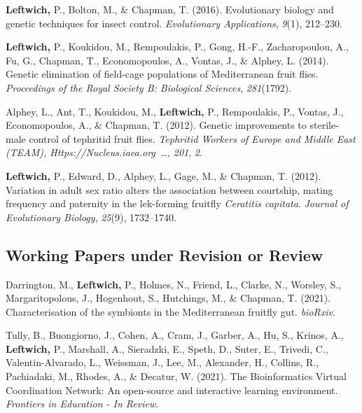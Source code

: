 \documentclass[11pt, a4paper]{awesome-cv}
\begin{document}
\leavevmode\hypertarget{ref-1}{}%
\textbf{Leftwich,} P., Bolton, M., \& Chapman, T. (2016). Evolutionary
biology and genetic techniques for insect control. \emph{Evolutionary
Applications}, \emph{9}(1), 212--230.

\leavevmode\hypertarget{ref-2}{}%
\textbf{Leftwich,} P., Koukidou, M., Rempoulakis, P., Gong, H.-F.,
Zacharopoulou, A., Fu, G., Chapman, T., Economopoulos, A., Vontas, J.,
\& Alphey, L. (2014). Genetic elimination of field-cage populations of
{Mediterranean} fruit flies. \emph{Proceedings of the Royal Society B:
Biological Sciences}, \emph{281}(1792).

\leavevmode\hypertarget{ref-18}{}%
Alphey, L., Ant, T., Koukidou, M., \textbf{Leftwich,} P., Rempoulakis,
P., Vontas, J., Economopoulos, A., \& Chapman, T. (2012). Genetic
improvements to sterile-male control of tephritid fruit flies.
\emph{Tephritid Workers of Europe and Middle East (TEAM),
Https://Nucleus.iaea.org~\ldots, 201}, \emph{2}.

\leavevmode\hypertarget{ref-4}{}%
\textbf{Leftwich,} P., Edward, D., Alphey, L., Gage, M., \& Chapman, T.
(2012). Variation in adult sex ratio alters the association between
courtship, mating frequency and paternity in the lek-forming fruitfly
\emph{{Ceratitis} capitata}. \emph{Journal of Evolutionary Biology},
\emph{25}(9), 1732--1740.

\hypertarget{working-papers-under-revision-or-review}{%
\subsection{Working Papers under Revision or
Review}\label{working-papers-under-revision-or-review}}

\hypertarget{refs_working_paper}{}
\leavevmode\hypertarget{ref-3}{}%
Darrington, M., \textbf{Leftwich,} P., Holmes, N., Friend, L., Clarke,
N., Worsley, S., Margaritopolous, J., Hogenhout, S., Hutchings, M., \&
Chapman, T. (2021). Characterisation of the symbionts in the
{Mediterranean} fruitfly gut. \emph{bioRxiv}.

\leavevmode\hypertarget{ref-2}{}%
Tully, B., Buongiorno, J., Cohen, A., Cram, J., Garber, A., Hu, S.,
Krinos, A., \textbf{Leftwich,} P., Marshall, A., Sieradzki, E., Speth,
D., Suter, E., Trivedi, C., Valentin-Alvarado, L., Weissman, J., Lee,
M., Alexander, H., Collins, R., Pachiadaki, M., Rhodes, A., \& Decatur,
W. (2021). The {Bioinformatics} {Virtual} {Coordination} {Network}: An
open-source and interactive learning environment. \emph{Frontiers in
Education - In Review}.
\end{document}
